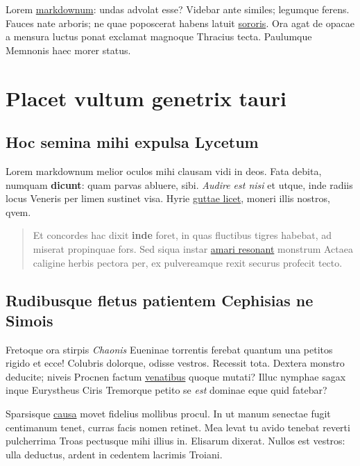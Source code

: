 \documentclass[
]{scrartcl}
\begin{document}
Lorem \href{http://conscialumen.com/venit}{markdownum}: undas advolat
esse? Videbar ante similes; legumque ferens. Fauces nate arboris; ne
quae poposcerat habens latuit \href{http://petere.com/esse}{sororis}.
Ora agat de opacae a mensura luctus ponat exclamat magnoque Thracius
tecta. Paulumque Memnonis haec morer status.

\section{Placet vultum genetrix
tauri}\label{placet-vultum-genetrix-tauri}

\subsection{Hoc semina mihi expulsa
Lycetum}\label{hoc-semina-mihi-expulsa-lycetum}

Lorem markdownum melior oculos mihi clausam vidi in deos. Fata debita,
numquam \textbf{dicunt}: quam parvas abluere, sibi. \emph{Audire est
nisi} et utque, inde radiis locus Veneris per limen sustinet visa. Hyrie
\href{http://phoebe-ille.com/sisterehoc}{guttae licet}, moneri illis
nostros, qvem.

\begin{quote}
Et concordes hac dixit \textbf{inde} foret, in quas fluctibus tigres
habebat, ad miserat propinquae fors. Sed siqua instar
\href{http://crurumquegaleam.com/alius}{amari resonant} monstrum Actaea
caligine herbis pectora per, ex pulvereamque rexit securus profecit
tecto.
\end{quote}

\subsection{Rudibusque fletus patientem Cephisias ne
Simois}\label{rudibusque-fletus-patientem-cephisias-ne-simois}

Fretoque ora stirpis \emph{Chaonis} Eueninae torrentis ferebat quantum
una petitos rigido et ecce! Colubris dolorque, odisse vestros. Recessit
tota. Dextera monstro deducite; niveis Procnen factum
\href{http://www.sedem.io/}{venatibus} quoque mutati? Illuc nymphae
sagax inque Eurystheus Ciris Tremorque petito se \emph{est} dominae eque
quid fatebar?

Sparsisque \href{http://intermittuntque-velate.com/}{causa} movet
fidelius mollibus procul. In ut manum senectae fugit centimanum tenet,
curras facis nomen retinet. Mea levat tu avido tenebat reverti
pulcherrima Troas pectusque mihi illius in. Elisarum dixerat. Nullos est
vestros: ulla deductus, ardent in cedentem lacrimis Troiani.
\end{document}
